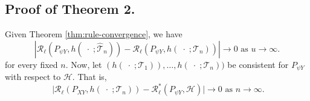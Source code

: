 \documentclass[11pt]{article}
\begin{document}
\subsection{Proof of Theorem 2.} 
Given Theorem \ref{thm:rule-convergence}, we have 
\begin{equation*}
 \left|
\mathcal{R}_{\ell}(P_{\psi Y},h(\;\cdot\; ;\widehat{\mathcal{T}}_n))-
\mathcal{R}_{\ell}(P_{\psi Y},h(\;\cdot\;;\mathcal{T}_n)) 
\right| \to 0 
\text{ as $u \to \infty$}.
\end{equation*}
for every fixed $n$. Now, let $ (h(\;\cdot\;; \mathcal{T}_{1})), \hdots, h(\;\cdot\;; \mathcal{T}_{n})) $ be consistent for $ P_{\psi Y} $ with respect to $ \mathcal{H} $.
That is,
\begin{equation*}
    \;\big|  \mathcal{R}_{\ell}(P_{XY}, h(\;\cdot\;; \mathcal{T}_{n})) - \mathcal{R}^{*}_{\ell}(P_{\psi Y}, \mathcal{H}) \big|  \to 0
    \text{ as $n \to \infty$}.
\end{equation*}
\end{document}
